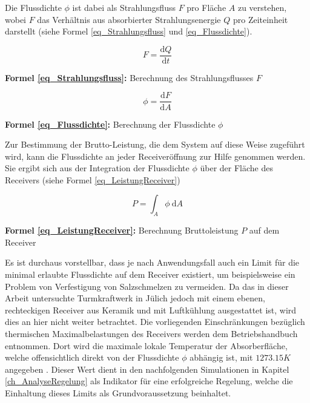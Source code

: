 Die Flussdichte $\phi$ ist dabei als Strahlungsfluss $F$ pro Fläche $A$ zu verstehen, wobei $F$ das Verhältnis aus absorbierter Strahlungsenergie $Q$ pro Zeiteinheit darstellt (siehe Formel \ref{eq_Strahlungsfluss} und \ref{eq_Flussdichte}).

\begin{equation} \label{eq_Strahlungsfluss}
    F = \frac{\text{d}Q}{\text{d} t}
\end{equation}
\centerline{\small{\textsf{\textbf{Formel \ref{eq_Strahlungsfluss}:}} Berechnung des Strahlungsflusses $F$}}

\begin{equation} \label{eq_Flussdichte}
    \phi = \frac{\text{d}F}{\text{d} A}
\end{equation}
\centerline{\small{\textsf{\textbf{Formel \ref{eq_Flussdichte}:}} Berechnung der Flussdichte $\phi$}}

Zur Bestimmung der Brutto-Leistung, die dem System auf diese Weise zugeführt wird, kann die Flussdichte an jeder Receiveröffnung zur Hilfe genommen werden.
Sie ergibt sich aus der Integration der Flussdichte $\phi$ über der Fläche des Receivers (siehe Formel \ref{eq_LeistungReceiver})

\begin{equation} \label{eq_LeistungReceiver}
    P = \int_{A}\phi~\text{d} A
\end{equation}
\centerline{\small{\textsf{\textbf{Formel \ref{eq_LeistungReceiver}:}} Berechnung Bruttoleistung $P$ auf dem Receiver}}

Es ist durchaus vorstellbar, dass je nach Anwendungsfall auch ein Limit für die minimal erlaubte Flussdichte auf dem Receiver existiert, um beispielsweise ein Problem von Verfestigung von Salzschmelzen zu vermeiden.
Da das in dieser Arbeit untersuchte Turmkraftwerk in Jülich jedoch mit einem ebenen, rechteckigen Receiver aus Keramik und mit Luftkühlung ausgestattet ist, wird dies an hier nicht weiter betrachtet.
Die vorliegenden Einschränkungen bezüglich thermischen Maximalbelastungen des Receivers werden dem Betriebshandbuch entnommen.
Dort wird die maximale lokale Temperatur der Absorberfläche, welche offensichtlich direkt von der Flussdichte $\phi$ abhängig ist, mit $1273.15K$ angegeben \cite{HandbuchJülich}. Dieser Wert dient in den nachfolgenden Simulationen in Kapitel \ref{ch_AnalyseRegelung} als Indikator für eine erfolgreiche Regelung, welche die Einhaltung dieses Limits als Grundvoraussetzung beinhaltet.

